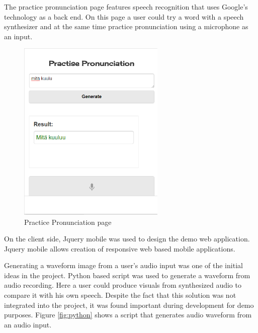 \documentclass[11pt,a4paper,oneside,article]{memoir}
\begin{document}
The practice pronunciation page features speech recognition that uses Google's technology as a back end. On this page a user could try a word with a speech synthesizer and at the same time practice pronunciation using a microphone as an input.
\begin{figure}[h]
\includegraphics[width=7cm]{pronunciation}
\caption{Practice Pronunciation page}
\label{fig:pronunciation}
\end{figure}

On the client side, Jquery mobile was used to design the demo web application. Jquery mobile allows creation of responsive web based mobile applications.


Generating a waveform image from a user's audio input was one of the initial ideas in the project. Python based script was used to generate a waveform from audio recording. Here a user could produce visuals from synthesized audio to compare it with his own speech. Despite the fact that this solution was not integrated into the project, it was found important during development for demo purposes. Figure \vref{fig:python} shows a script that generates audio waveform  from an audio input.
\end{document}
